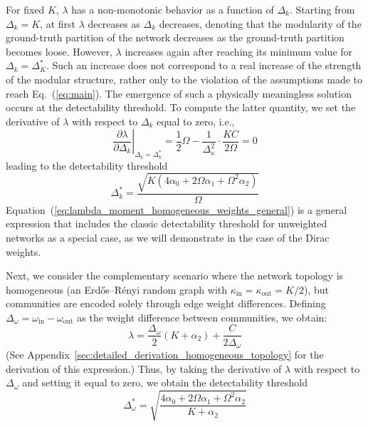 \documentclass[a4paper,pre,superscriptaddress,floatfix,nofootinbib,twocolumn]{revtex4-1}
\begin{document}
For fixed $K$, $\lambda$ has a non-monotonic behavior as a function of $\Delta_k$. Starting from $\Delta_k = K$, at first $\lambda$ decreases as $\Delta_k$ decreases, denoting that the modularity of the ground-truth partition of the network decreases as the ground-truth partition becomes loose. However, $\lambda$ increases again after reaching its minimum value for $\Delta_k = \Delta^*_K$. Such an increase does not correspond to a real increase of the strength of the modular structure, rather only to the violation of the assumptions made to reach Eq.~(\ref{eq:main}). The emergence of such a physically meaningless solution occurs at the detectability threshold. To compute the latter quantity, we set the derivative of $\lambda$ with respect to $\Delta_k$ equal to zero, i.e.,
\begin{equation}
    \left. \frac{\partial \lambda}{\partial \Delta_k} \right|_{\Delta_k = \Delta_k^*} =
    \frac{1}{2}\Omega - \frac{1}{\Delta_{\kappa}^2} \cdot \frac{KC}{2\Omega}
    = 0
\end{equation}
leading to the detectability threshold
\begin{equation}
\Delta_k^* = \frac{\sqrt{K \left( 4 \alpha_{0}+ 2 \Omega \alpha_{1}+\Omega^{2} \alpha_{2} \right)}}{\Omega}
\label{eq:lambda_moment_homogeneous_weights_general}
\end{equation}
Equation~(\ref{eq:lambda_moment_homogeneous_weights_general}) is a general expression that includes the classic detectability threshold for unweighted networks as a special case, as we will demonstrate in the case of the Dirac weights.

Next, we consider the complementary scenario where the network topology is homogeneous (an Erd\H{o}s--R\'enyi random graph with $\kappa_\text{in} = \kappa_\text{out} = K/2$), but communities are encoded solely through edge weight differences. Defining $\Delta_\omega = \omega_\text{in} - \omega_\text{out}$ as the weight difference between communities, we obtain:
\begin{equation}
    \lambda = \frac{\Delta_{\omega}}{2} \left(K + \alpha_2 \right) + \frac{C}{2 \Delta_{\omega}}
    \label{eq:lambda_moment_homogeneous_weights_general_omega}
\end{equation}
(See Appendix~\ref{sec:detailed_derivation_homogeneous_topology} for the derivation of this expression.)
Thus, by taking the derivative of $\lambda$ with respect to $\Delta_\omega$ and setting it equal to zero, we obtain the detectability threshold
\begin{equation}
    \Delta_\omega^* = \sqrt{\frac{4 \alpha_{0} + 2 \Omega \alpha_{1} + \Omega^{2} \alpha_{2} }{K + \alpha_{2}}}
    \label{eq:lambda_moment_homogeneous_weights_general_omega}
\end{equation}
\end{document}
